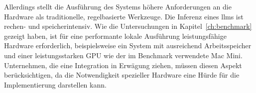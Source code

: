 Allerdings stellt die Ausführung des Systems höhere Anforderungen an die Hardware als traditionelle, regelbasierte Werkzeuge.
Die Inferenz eines \glspl{llm} ist rechen- und speicherintensiv.
Wie die Untersuchungen in Kapitel~\ref{ch:benchmark} gezeigt haben, ist für eine performante lokale Ausführung leistungsfähige Hardware erforderlich, beispielsweise ein System mit ausreichend Arbeitsspeicher und einer leistungsstarken GPU wie der im Benchmark verwendete Mac Mini.
Unternehmen, die eine Integration in Erwägung ziehen, müssen diesen Aspekt berücksichtigen, da die Notwendigkeit spezieller Hardware eine Hürde für die Implementierung darstellen kann.
